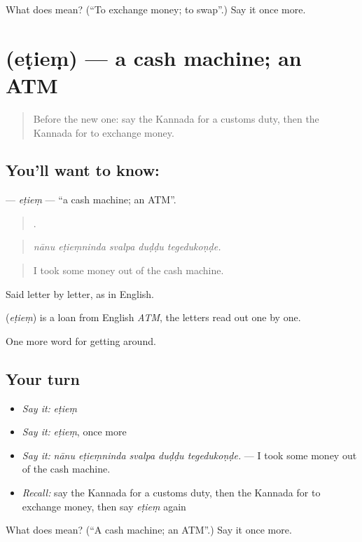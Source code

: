 \begin{tcolorbox}[breakable,colback=teal!4,colframe=teal!35!black,title={Before you move on}]
What does   mean? (\textquotedblleft{}To exchange money; to swap\textquotedblright{}.) Say it once more.
\end{tcolorbox}
\section[\texorpdfstring{\kn{ಎಟಿಎಂ} (eṭieṃ)}{ಎಟಿಎಂ (eṭieṃ)}]{ (eṭieṃ) — a cash machine; an ATM}

\label{lesson:KA-C439-etiem}



\begin{quote}
Before the new one: say the Kannada for a customs duty, then the Kannada for to exchange money.
\end{quote}

\subsection*{You'll want to know: }
\textbf{} — \emph{eṭieṃ} — \textquotedblleft{}a cash machine; an ATM\textquotedblright{}.

\begin{quote}
    .
\end{quote}

\begin{quote}
\emph{nānu eṭieṃninda svalpa duḍḍu tegedukoṇḍe.}
\end{quote}

\begin{quote}
I took some money out of the cash machine.
\end{quote}

Said letter by letter, as in English.

\begin{cousinweb}
\textbf{} (\emph{eṭieṃ}) is a loan from English \emph{ATM}, the letters read out one by one.
\end{cousinweb}

\begin{grammarlens}[title={What you've built}]
One more word for getting around.
\end{grammarlens}

\subsection*{Your turn}
\begin{itemize}
\raggedright
  \item \emph{Say it:} \emph{eṭieṃ}
  \item \emph{Say it:} \emph{eṭieṃ}, once more
  \item \emph{Say it:} \emph{nānu eṭieṃninda svalpa duḍḍu tegedukoṇḍe.} — I took some money out of the cash machine.
  \item \emph{Recall:} say the Kannada for a customs duty, then the Kannada for to exchange money, then say \emph{eṭieṃ} again
\end{itemize}

\begin{tcolorbox}[breakable,colback=teal!4,colframe=teal!35!black,title={Before you move on}]
What does  mean? (\textquotedblleft{}A cash machine; an ATM\textquotedblright{}.) Say it once more.
\end{tcolorbox}
